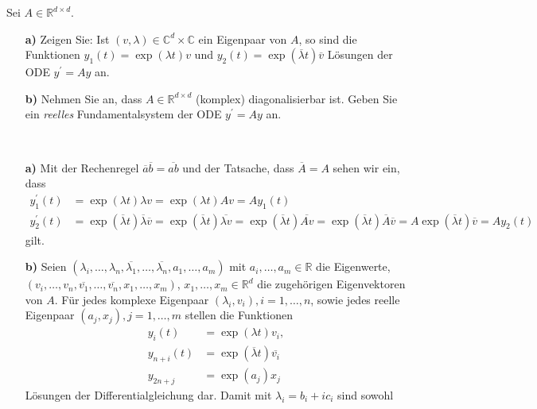 \begin{exercise}
Sei $A \in \mathbb{R}^{d\times d}$.
\begin{itemize}
  \item [\textbf{a)}]Zeigen Sie: Ist $(v,\lambda) \in \mathbb{C}^d
  \times \mathbb{C}$ ein Eigenpaar von $A$, so sind die Funktionen
  $y_1(t) = \exp(\lambda t)v$ und $y_2(t) = \exp(\overline{\lambda}t)\overline{v}$
  Lösungen der ODE $y^{\prime} = Ay$ an.
  \item [\textbf{b)}] Nehmen Sie an, dass $A \in \mathbb{R}^
  {d \times d}$ (komplex) diagonalisierbar ist. Geben Sie ein
  \textit{reelles} Fundamentalsystem der ODE $y^{\prime} = Ay$ an.
\end{itemize}
\end{exercise}
\begin{solution}
\leavevmode \\
\begin{itemize}
  \item [\textbf{a)}]
  Mit der Rechenregel $\overline{a}\overline{b} = \overline{ab}$ und der Tatsache, dass $\overline{A} = A$
  sehen wir ein, dass
  \begin{align*}
    y_1^{\prime}(t) &= \exp(\lambda t)\lambda v = \exp(\lambda t)A v = Ay_1(t) \\
    y_2^{\prime}(t) &= \exp(\overline{\lambda}t)\overline{\lambda}\overline{v} = \exp(\overline{\lambda}t) \overline{\lambda v} =
    \exp(\overline{\lambda}t) \overline{Av} =  \exp(\overline{\lambda}t) \overline{A}\overline{v} = A\exp(\overline{\lambda}t)\overline{v} = Ay_2(t)
  \end{align*}
  gilt.
  \item [\textbf{b)}]
  Seien $(\lambda_i,\dots,\lambda_n,\overline{\lambda_1},\dots,\overline{\lambda_n},a_1,\dots,a_m)$
  mit $a_i,\dots,a_m \in \mathbb{R}$ die Eigenwerte, \\
  $(v_i,\dots,v_n,\overline{v_1},\dots,\overline{v_n},x_1,\dots,x_m)$, $x_1,\dots,x_m \in \mathbb{R}^d$
  die zugehörigen Eigenvektoren von $A$.
  Für jedes komplexe Eigenpaar $(\lambda_i, v_i), i = 1,\dots,n$, sowie jedes
  reelle Eigenpaar $(a_j,x_j), j = 1,\dots,m$ stellen die Funktionen
  \begin{align*}
    y_{i}(t) &= \exp(\lambda t)v_i, \\
    y_{n + i}(t) &= \exp(\overline{\lambda} t)\overline{v_i} \\
    y_{2n + j} &= \exp(a_j)x_j
  \end{align*}
  Lösungen der Differentialgleichung dar. Damit mit $\lambda_i = b_i + ic_i$ sind sowohl

\end{itemize}
\end{solution}
